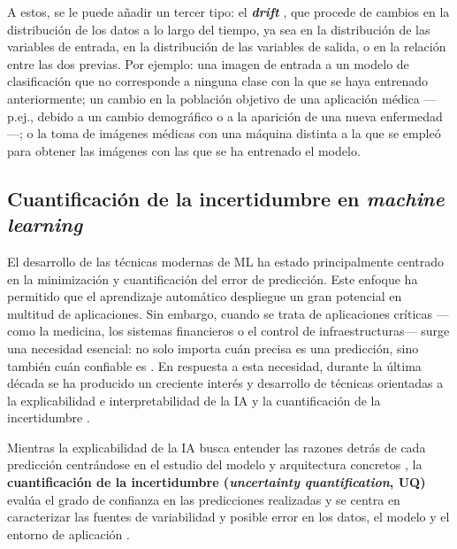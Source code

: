 A estos, se le puede añadir un tercer tipo: el \textbf{\textit{drift}} \cite{gama2012, nemani2023}, que 
procede de cambios en la distribución de los datos a lo largo del tiempo, ya sea en la distribución de las 
variables de entrada, en la distribución de las variables de salida, o en la relación entre las dos previas. 
Por ejemplo: una imagen de entrada a un modelo de clasificación que no corresponde a ninguna clase con la que 
se haya entrenado anteriormente; un cambio en la población objetivo de una aplicación médica ---p.ej., debido 
a un cambio demográfico o a la aparición de una nueva enfermedad---; o la toma de imágenes médicas con una 
máquina distinta a la que se empleó para obtener las imágenes con las que se ha entrenado el modelo.


\subsection{Cuantificación de la incertidumbre en \textit{machine learning}} 

El desarrollo de las técnicas modernas de ML ha estado principalmente centrado en la minimización y 
cuantificación del error de predicción. Este enfoque ha permitido que el aprendizaje automático despliegue un 
gran potencial en multitud de aplicaciones.
Sin embargo, cuando se trata de aplicaciones críticas ---como la medicina, los sistemas financieros o el 
control de infraestructuras--- surge una necesidad esencial: no solo importa cuán precisa es una predicción, 
sino también cuán confiable es \cite{begoli2019}. 
En respuesta a esta necesidad, durante la última década se ha producido un creciente interés y desarrollo de 
técnicas orientadas a la explicabilidad e interpretabilidad de la IA 
\cite{angelov2021, ali2023, miller2019, loh2022} y la cuantificación de la incertidumbre
\cite{abdar2021, psaros2023, nemani2023}.

Mientras la explicabilidad de la IA busca entender las razones detrás de cada predicción centrándose en el 
estudio del modelo y arquitectura concretos \cite{salvi2025}, la 
\textbf{cuantificación de la incertidumbre (\textit{uncertainty quantification}, UQ)} evalúa el grado de 
confianza en las predicciones realizadas y se centra en caracterizar las fuentes de variabilidad y posible 
error en los datos, el modelo y el entorno de aplicación \cite{nemani2023}.



